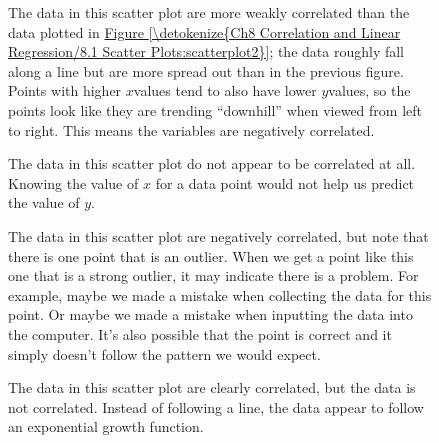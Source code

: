 \documentclass[letterpaper,10pt,english]{jupyterBook}
\begin{document}
\begin{figure}[htbp]
\centering
\capstart

\noindent{}
\caption{The data in this scatter plot are more weakly correlated than the data plotted in \hyperref[\detokenize{Ch8 Correlation and Linear Regression/8.1 Scatter Plots:scatterplot2}]{Figure \ref{\detokenize{Ch8 Correlation and Linear Regression/8.1 Scatter Plots:scatterplot2}}}; the data roughly fall along a line but are more spread out than in the previous figure. Points with higher \(x\)\sphinxhyphen{}values tend to also have lower \(y\)\sphinxhyphen{}values, so the points look like they are trending “downhill” when viewed from left to right. This means the variables are negatively correlated.}\label{\detokenize{Ch8 Correlation and Linear Regression/8.1 Scatter Plots:scatterplot3}}\end{figure}

\begin{figure}[htbp]
\centering
\capstart

\noindent{}
\caption{The data in this scatter plot do not appear to be correlated at all. Knowing the value of \(x\) for a data point would not help us predict the value of \(y\).}\label{\detokenize{Ch8 Correlation and Linear Regression/8.1 Scatter Plots:scatterplot4}}\end{figure}

\begin{figure}[htbp]
\centering
\capstart

\noindent{}
\caption{The data in this scatter plot are negatively correlated, but note that there is one point that is an outlier. When we get a point like this one that is a strong outlier, it may indicate there is a problem. For example, maybe we made a mistake when collecting the data for this point. Or maybe we made a mistake when inputting the data into the computer. It’s also possible that the point is correct and it simply doesn’t follow the pattern we would expect.}\label{\detokenize{Ch8 Correlation and Linear Regression/8.1 Scatter Plots:scatterplot5}}\end{figure}

\begin{figure}[htbp]
\centering
\capstart

\noindent{}
\caption{The data in this scatter plot are clearly correlated, but the data is not  correlated. Instead of following a line, the data appear to follow an exponential growth function.}\label{\detokenize{Ch8 Correlation and Linear Regression/8.1 Scatter Plots:scatterplot6}}\end{figure}
\end{document}

